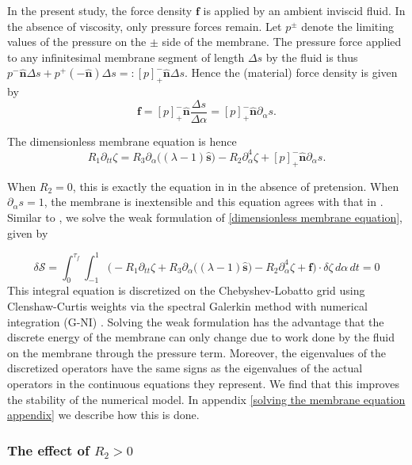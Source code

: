\documentclass{article}[12pt]
\theoremstyle{Theorem}
\begin{document}
In the present study, the force density $\boldsymbol{f}$ is applied by an ambient inviscid fluid. In the absence of viscosity, only pressure forces remain. Let $p^\pm$ denote the limiting values of the pressure on the $\pm$ side of the membrane. The pressure force applied to any infinitesimal membrane segment of length $\Delta s$ by the fluid is thus  $ p^-\hat{\boldsymbol{n}}\Delta s + p^+(-\hat{\boldsymbol{n}})\Delta s=: [p]^-_+\hat{\boldsymbol{n}}\Delta s$. Hence the (material) force density is given by $$\boldsymbol{f} = [p]^-_+\hat{\boldsymbol{n}}\frac{\Delta s}{\Delta\alpha} =  [p]^-_+\hat{\boldsymbol{n}}\partial_\alpha s.$$ 

 The dimensionless membrane equation is hence
 \begin{equation}
     R_1\partial_{tt}\zeta  = R_3\partial_\alpha\big( (\lambda-1)\hat{\boldsymbol{s}}\big)- R_2\partial_\alpha^4\zeta + [p]^-_+\hat{\boldsymbol{n}}\partial_\alpha s.
     \label{dimensionless membrane equation}
\end{equation}

When $R_2 = 0$, this is exactly the equation in \cite{mavroyiakoumou2020large} in the absence of pretension. When $\partial_\alpha s = 1$, the membrane is inextensible and this equation agrees with that in \cite{alben2009simulating}. Similar to \cite{sun2022dynamics, zhang2026flapping}, we solve the weak formulation of \eqref{dimensionless membrane equation}, given by 

\begin{equation}
    \delta\mathcal{S} =\int_0^{\tau_f}\int_{-1}^1\bigg(-R_1\partial_{tt}\zeta +R_3\partial_\alpha\big( (\lambda-1)\hat{\boldsymbol{s}}\big) - R_2\partial_\alpha^4\zeta +\boldsymbol{f} \bigg)\cdot\delta\zeta\,d\alpha\, dt = 0
    \label{linearized weak form membrane equation}
\end{equation}
This integral equation is discretized on the Chebyshev-Lobatto grid using Clenshaw-Curtis weights via the spectral Galerkin method with numerical integration (G-NI) \cite{canuto2006spectral}. Solving the weak formulation has the advantage that the discrete energy of the membrane can only change due to work done by the fluid on the membrane through the pressure term. Moreover, the eigenvalues of the discretized operators have the same signs as the eigenvalues of the actual operators in the continuous equations they represent. We find that this improves the stability of the numerical model. In appendix \ref{solving the membrane equation appendix} we describe how this is done.
\subsubsection{The effect of $R_2 > 0$}
\label{R2 > 0 section}
\end{document}
